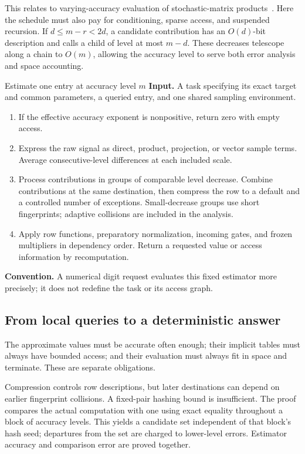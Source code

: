 \documentclass[11pt]{article}
\numberwithin{equation}{section}
\theoremstyle{definition}
\theoremstyle{remark}
\begin{document}
This relates to varying-accuracy evaluation of stochastic-matrix products~\cite{CohenDoronSberloTaShma2023}. Here the schedule must also pay for conditioning, sparse access, and suspended recursion. If \(d\leq m-r<2d\), a candidate contribution has an \(O(d)\)-bit description and calls a child of level at most \(m-d\). These decreases telescope along a chain to \(O(m)\), allowing the accuracy level to serve both error analysis and space accounting.

\begin{algorithm}[label=alg:overview-query]{Estimate one entry at accuracy level \(m\)}
\textbf{Input.} A task specifying its exact target and common parameters, a queried entry, and one shared sampling environment.
\begin{enumerate}[leftmargin=*]
\item If the effective accuracy exponent is nonpositive, return zero with empty access.
\item Express the raw signal as direct, product, projection, or vector sample terms. Average consecutive-level differences at each included scale.
\item Process contributions in groups of comparable level decrease. Combine contributions at the same destination, then compress the row to a default and a controlled number of exceptions. Small-decrease groups use short fingerprints; adaptive collisions are included in the analysis.
\item Apply row functions, preparatory normalization, incoming gates, and frozen multipliers in dependency order. Return a requested value or access information by recomputation.
\end{enumerate}
\textbf{Convention.} A numerical digit request evaluates this fixed estimator more precisely; it does not redefine the task or its access graph.
\end{algorithm}

\subsection{From local queries to a deterministic answer}

The approximate values must be accurate often enough; their implicit tables must always have bounded access; and their evaluation must always fit in space and terminate. These are separate obligations.

Compression controls row descriptions, but later destinations can depend on earlier fingerprint collisions. A fixed-pair hashing bound is insufficient. The proof compares the actual computation with one using exact equality throughout a block of accuracy levels. This yields a candidate set independent of that block's hash seed; departures from the set are charged to lower-level errors. Estimator accuracy and comparison error are proved together.
\end{document}
